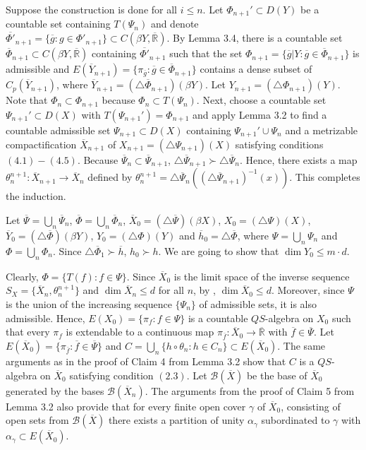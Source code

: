 \documentclass[12pt]{amsart}
\begin{document}
Suppose the construction is done for all $i\leq n$. Let $\Phi_{n+1}'\subset D(Y)$ be a countable set containing $T(\Psi_n)$ and denote 
 $\overline{\Phi'}_{n+1}=\{\overline g:g\in\Phi'_{n+1}\}\subset C(\beta Y,\overline{\mathbb R})$. By Lemma 3.4, there is a countable set $\overline\Phi_{n+1}\subset C(\beta Y,\overline{\mathbb R})$ containing $\overline{\Phi'}_{n+1}$ such that the set
$\Phi_{n+1}=\{\overline g|Y:\overline g\in\overline\Phi_{n+1}\}$ is admissible and 
 $E(\overline Y_{n+1})=\{\pi_{\overline g}:\overline g\in\overline\Phi_{n+1}\}$ contains a dense subset of $C_p(\overline Y_{n+1})$, where 
$\overline Y_{n+1}=(\triangle\overline\Phi_{n+1})(\beta Y)$. Let  $Y_{n+1}=(\triangle\Phi_{n+1})(Y)$.
Note that $\Phi_n\subset\Phi_{n+1}$ because $\Phi_n\subset T(\Psi_n)$.
Next, choose a countable set $\Psi_{n+1}'\subset D(X)$ with $T(\Psi_{n+1}')=\Phi_{n+1}$ and apply Lemma 3.2 to find  a countable admissible set $\Psi_{n+1}\subset D(X)$ containing 
$\Psi_{n+1}'\cup\Psi_n$ and a metrizable compactification $\overline X_{n+1}$ of $X_{n+1}=(\triangle\Psi_{n+1})(X)$ satisfying conditions $(4.1)-(4.5)$.
Because $\overline\Psi_n\subset\overline\Psi_{n+1}$, $\triangle\overline\Psi_{n+1}\succ\triangle\overline\Psi_{n}$. Hence, there exists a map  
$\theta^{n+1}_n:\overline X_{n+1}\to\overline X_n$ defined by $\theta^{n+1}_n=\triangle\overline\Psi_{n}((\triangle\overline\Psi_{n+1})^{-1}(x))$. 
This completes the induction. 

Let $\overline\Psi=\bigcup_n\overline\Psi_n$, $\overline\Phi=\bigcup_n\overline\Phi_n$,
$\overline X_0=(\triangle\overline\Psi)(\beta X)$, $X_0=(\triangle\Psi)(X)$,
$\overline Y_0=(\triangle\overline\Phi)(\beta Y)$, $Y_0=(\triangle\Phi)(Y)$ and $\overline h_0=\triangle\overline\Phi$, where $\Psi=\bigcup_n\Psi_n$ and $\Phi=\bigcup_n\Phi_n$. Since $\triangle\overline\Phi_1\succ\overline h$, $h_0\succ h$. We are going to show that $\dim Y_0\leq m\cdot d$. 

Clearly, $\Phi=\{T(f): f\in\Psi\}$.
Since $\overline X_0$ is the limit space of the inverse sequence $S_X=\{\overline X_n,\theta^{n+1}_n\}$ and $\dim\overline X_n\leq d$ for all $n$, by \cite[Theorem 3.4.11]{en}, $\dim\overline X_0\leq d$. Moreover, since $\Psi$ is the union of the increasing sequence $\{\Psi_n\}$ of admissible sets, it is also admissible. Hence,
$E(X_0)=\{\pi_f:f\in\Psi\}$ is a countable $QS$-algebra on $X_0$ such that every $\pi_f$ is extendable to a continuous map $\pi_{\overline f}:\overline X_0\to\overline{\mathbb R}$ with $\overline f\in\overline\Psi$. Let $E(\overline X_0)=\{\pi_{\overline f}:\overline f\in\overline\Psi\}$ and
$C=\bigcup_n\{h\circ\theta_n:h\in C_n\}\subset E(\overline X_0)$. The same arguments as in the proof of Claim 4 from Lemma 3.2 show that $C$ is a $QS$-algebra on $\overline X_0$ satisfying condition $(2.3)$. Let $\mathcal B(\overline X)$ be the base of $\overline X_0$ generated by the bases $\mathcal B(\overline X_n)$. The arguments from the proof of Claim 5 from Lemma 3.2 also provide that 
 for every finite open cover $\gamma$ of $\overline X_0$, consisting of open sets from $\mathcal B(\overline X)$ there exists a partition of unity $\alpha_\gamma$ subordinated to $\gamma$ with $\alpha_\gamma\subset E(\overline X_0)$. 
\end{document}
